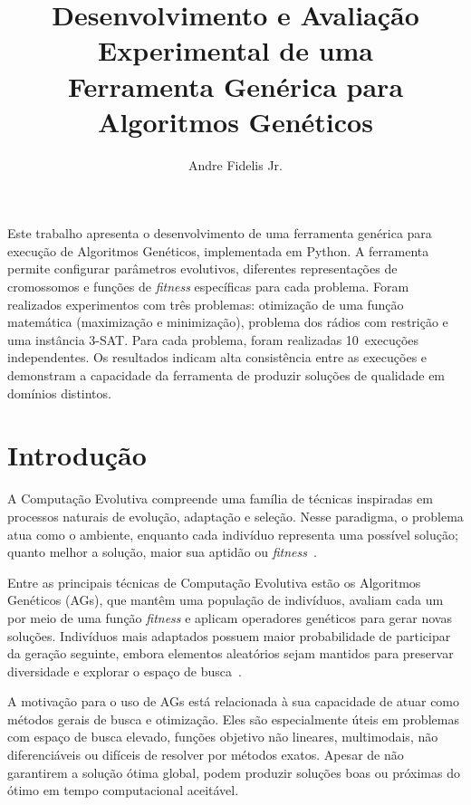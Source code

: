 \documentclass[12pt,twocolumn]{article}
\title{Desenvolvimento e Avaliação Experimental de uma\\
       Ferramenta Genérica para Algoritmos Genéticos}
\author{Andre Fidelis Jr.}
\begin{document}
\maketitle

\begin{resumo}
Este trabalho apresenta o desenvolvimento de uma ferramenta genérica para execução de
Algoritmos Genéticos, implementada em Python. A ferramenta permite configurar parâmetros
evolutivos, diferentes representações de cromossomos e funções de \textit{fitness}
específicas para cada problema. Foram realizados experimentos com três problemas:
otimização de uma função matemática (maximização e minimização), problema dos rádios com
restrição e uma instância 3-SAT. Para cada problema, foram realizadas 10~execuções
independentes. Os resultados indicam alta consistência entre as execuções e demonstram a
capacidade da ferramenta de produzir soluções de qualidade em domínios distintos.
\end{resumo}

\section{Introdução}

A Computação Evolutiva compreende uma família de técnicas inspiradas em processos naturais
de evolução, adaptação e seleção. Nesse paradigma, o problema atua como o ambiente,
enquanto cada indivíduo representa uma possível solução; quanto melhor a solução, maior
sua aptidão ou \textit{fitness}~\cite{vonzuben2000}.

Entre as principais técnicas de Computação Evolutiva estão os Algoritmos Genéticos
(AGs), que mantêm uma população de indivíduos, avaliam cada um por meio de uma função
\textit{fitness} e aplicam operadores genéticos para gerar novas soluções. Indivíduos
mais adaptados possuem maior probabilidade de participar da geração seguinte, embora
elementos aleatórios sejam mantidos para preservar diversidade e explorar o espaço de
busca~\cite{tutorialspoint2016}.

A motivação para o uso de AGs está relacionada à sua capacidade de atuar como métodos
gerais de busca e otimização. Eles são especialmente úteis em problemas com espaço de
busca elevado, funções objetivo não lineares, multimodais, não diferenciáveis ou difíceis
de resolver por métodos exatos. Apesar de não garantirem a solução ótima global, podem
produzir soluções boas ou próximas do ótimo em tempo computacional aceitável.
\end{document}
